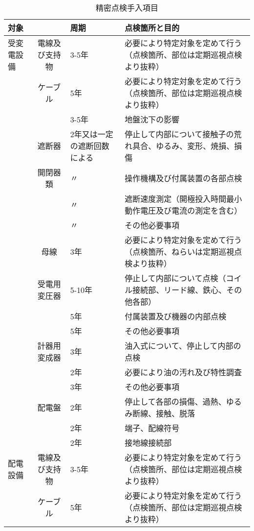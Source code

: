 \documentclass[10pt,a4paper,uplatex]{jsarticle}
\begin{document}
\begin{table}[b]
\scriptsize
  \caption{精密点検手入項目}
  \label{精密点検手入項目}
  \begin{tabular}{|l|c|p{1cm}|p{10cm}|} \hline
    対象         & & 周期 & 点検箇所と目的  \\ \hline
受変電設備
    &電線及び支持物  & 3-5年 & 必要により特定対象を定めて行う（点検箇所、部位は定期巡視点検より抜粋）  \\\cline{2-4}
    &ケーブル       & 5年 & 必要により特定対象を定めて行う（点検箇所、部位は定期巡視点検より抜粋）   \\
    &              & 3-5年 & 地盤沈下の影響  \\ \cline{2-4}
    &遮断器         & 2年又は一定の遮断回数による & 停止して内部について接触子の荒れ具合、ゆるみ、変形、焼損、損傷  \\ 
    &開閉器類       & 〃    & 操作機構及び付属装置の各部点検  \\
    &              & 〃    & 遮断速度測定（開極投入時間最小動作電圧及び電流の測定を含む）  \\
    &              & 〃    & その他必要事項  \\ \cline{2-4}
    &母線          & 3年 & 必要により特定対象を定めて行う（点検箇所、ねらいは定期巡視点検より抜粋）  \\\cline{2-4}
    &受電用変圧器   & 5-10年 & 停止して内部について点検（コイル接続部、リード線、鉄心、その他各部）  \\
    &              & 5年 & 付属装置及び機器の内部点検  \\ 
    &              & 5年 & その他必要事項  \\ \cline{2-4}
    &計器用変成器    & 3年 & 油入式について、停止して内部の点検  \\
    &              & 2年 & 必要により油の汚れ及び特性調査  \\
    &              & 3年 & その他必要事項  \\ \cline{2-4}
    &配電盤         & 2年 & 停止して各部の損傷、過熱、ゆるみ断線、接触、脱落  \\
    &              & 2年 & 端子、配線符号  \\
    &              & 2年 & 接地線接続部  \\\cline{2-4}
    \hline  
配電設備
    &電線及び支持物  & 3-5年 & 必要により特定対象を定めて行う（点検箇所、部位は定期巡視点検より抜粋）  \\\cline{2-4}
    &ケーブル       & 5年 & 必要により特定対象を定めて行う（点検箇所、部位は定期巡視点検より抜粋）   \\

\end{tabular}
\end{table}
\end{document}
